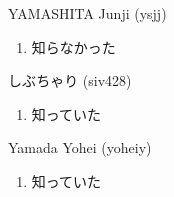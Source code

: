 \begin{prework}{ YAMASHITA Junji (ysjj) }
  \begin{enumerate}
  \item 知らなかった
  \end{enumerate}
\end{prework}

\begin{prework}{ しぶちゃり (siv428) }
  \begin{enumerate}
  \item 知っていた
  \end{enumerate}
\end{prework}

\begin{prework}{ Yamada Yohei (yoheiy) }
  \begin{enumerate}
  \item 知っていた
  \end{enumerate}
\end{prework}
